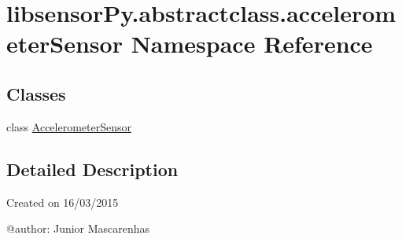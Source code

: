 \hypertarget{namespacelibsensorPy_1_1abstractclass_1_1accelerometerSensor}{}\section{libsensor\+Py.\+abstractclass.\+accelerometer\+Sensor Namespace Reference}
\label{namespacelibsensorPy_1_1abstractclass_1_1accelerometerSensor}
\subsection*{Classes}
\begin{DoxyCompactItemize}
\item 
class \hyperlink{classlibsensorPy_1_1abstractclass_1_1accelerometerSensor_1_1AccelerometerSensor}{Accelerometer\+Sensor}
\end{DoxyCompactItemize}


\subsection{Detailed Description}
\begin{DoxyVerb}Created on 16/03/2015

@author: Junior Mascarenhas
\end{DoxyVerb}
 
